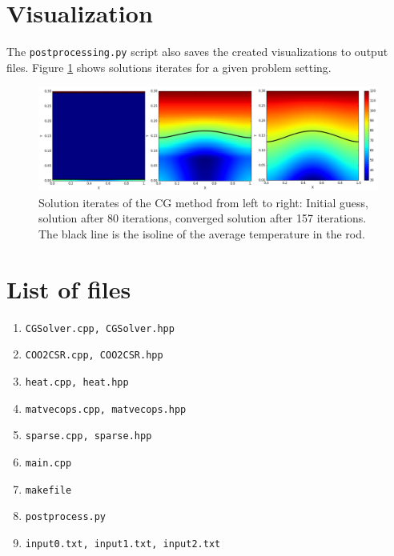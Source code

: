 \documentclass{article}
\begin{document}
\section{Visualization}

The \texttt{postprocessing.py} script also saves the created visualizations to output files. Figure \ref{fig} shows solutions iterates for a given problem setting.

\begin{figure}[t!]
\centering
\includegraphics[width=1.1\textwidth]{visualization.png}
\caption{Solution iterates of the CG method from left to right: Initial guess, solution after 80 iterations, converged solution after 157 iterations. The black line is the isoline of the average temperature in the rod.}
\label{fig}
\end{figure}

\section{List of files}
\begin{enumerate}

\item \texttt{CGSolver.cpp, CGSolver.hpp} \citep{files2}

\item \texttt{COO2CSR.cpp, COO2CSR.hpp} \citep{files}

\item \texttt{heat.cpp, heat.hpp} \citep{files2}

\item \texttt{matvecops.cpp, matvecops.hpp}

\item \texttt{sparse.cpp, sparse.hpp} \citep{files2}

\item \texttt{main.cpp} \citep{files2}

\item \texttt{makefile}

\item \texttt{postprocess.py}

\item \texttt{input0.txt, input1.txt, input2.txt} \citep{files}
\end{enumerate}


\end{document}
